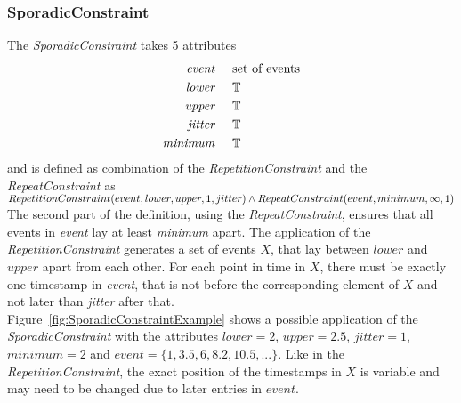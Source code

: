 	\subsubsection{SporadicConstraint}
		The \emph{SporadicConstraint} takes 5 attributes
		\begin{align*}
			\emph{event} 	& \hspace{.5cm}\text{set of events}\\
			\emph{lower} 	& \hspace{.5cm}\mathbb{T}\\
			\emph{upper} 	& \hspace{.5cm}\mathbb{T}\\
			\emph{jitter}	& \hspace{.5cm}\mathbb{T}\\
			\emph{minimum}	& \hspace{.5cm}\mathbb{T}
		\end{align*}
		and is defined as combination of the \emph{RepetitionConstraint} and the \emph{RepeatConstraint} as\\[10pt]
		\begin{math}
			RepetitionConstraint(event, lower, upper, 1, jitter)\\
			\land RepeatConstraint(event, minimum, \infty, 1)
		\end{math}\\[10pt]
		The second part of the definition, using the \emph{RepeatConstraint}, ensures that all events in \emph{event} lay at least \emph{minimum} apart. The application of the \emph{RepetitionConstraint} generates a set of events $X$, that lay between $lower$ and $upper$ apart from each other. For each point in time in $X$, there must be exactly one timestamp in \emph{event}, that is not before the corresponding element of $X$ and not later than \emph{jitter} after that.\\
		Figure~\ref{fig:SporadicConstraintExample} shows a possible application of the \emph{SporadicConstraint} with the attributes $lower=2$, $upper=2.5$, $jitter=1$, $minimum=2$ and $event=\{1, 3.5, 6, 8.2, 10.5,...\}$. Like in the \emph{RepetitionConstraint}, the exact position of the timestamps in $X$ is variable and may need to be changed due to later entries in $event$.
